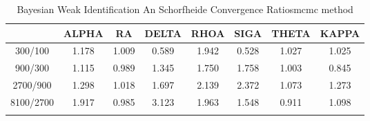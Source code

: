 \documentclass[a4paper,10pt]{article}
\begin{document}
\centering
\begin{longtable}{cccccccc}
\toprule
 & ALPHA & RA & DELTA & RHOA & SIGA & THETA & KAPPA \\
\midrule
300/100 & 1.178 & 1.009 & 0.589 & 1.942 & 0.528 & 1.027 & 1.025 \\
900/300 & 1.115 & 0.989 & 1.345 & 1.750 & 1.758 & 1.003 & 0.845 \\
2700/900 & 1.298 & 1.018 & 1.697 & 2.139 & 2.372 & 1.073 & 1.273 \\
8100/2700 & 1.917 & 0.985 & 3.123 & 1.963 & 1.548 & 0.911 & 1.098 \\
\bottomrule
\caption{Bayesian Weak Identification An Schorfheide Convergence Ratiosmcmc method}
\label{table:tbl:WeakAnSchoConvergenceRatios_mcmc}
\end{longtable}
\end{document}
